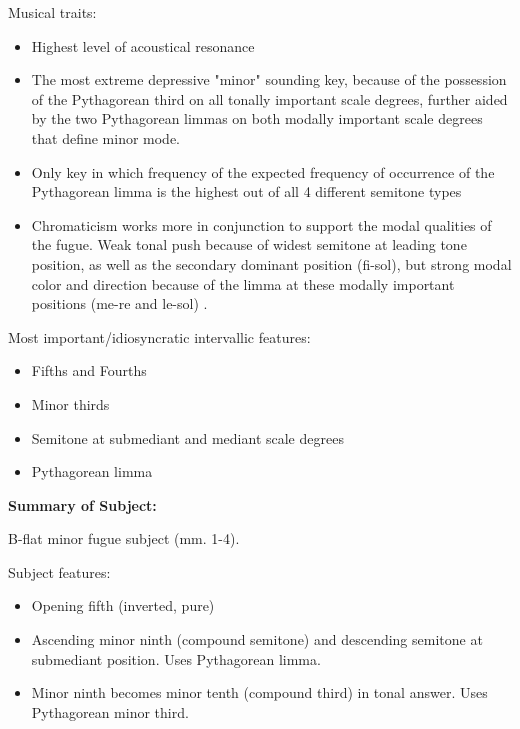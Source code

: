 Musical traits:

\begin{itemize}
\tightlist
\item
  Highest level of acoustical resonance
\item
  The most extreme depressive "minor" sounding key, because of the
  possession of the Pythagorean third on all tonally important scale
  degrees, further aided by the two Pythagorean limmas on both modally
  important scale degrees that define minor mode.
\item
  Only key in which frequency of the expected frequency of occurrence of
  the Pythagorean limma is the highest out of all 4 different semitone
  types
\item
  Chromaticism works more in conjunction to support the modal qualities
  of the fugue. Weak tonal push because of widest semitone at leading
  tone position, as well as the secondary dominant position (fi-sol),
  but strong modal color and direction because of the limma at these
  modally important positions (me-re and le-sol) .
\end{itemize}

Most important/idiosyncratic intervallic features:

\begin{itemize}
\tightlist
\item
  Fifths and Fourths
\item
  Minor thirds
\item
  Semitone at submediant and mediant scale degrees
\item
  Pythagorean limma
\end{itemize}

\textbf{Summary of Subject:}



\begin{Example}[H]
    \begin{center}
    \caption{ B-flat minor fugue subject (mm. 1-4). }
    \end{center}
\end{Example}
    

    \begin{center}
    \end{center}
    
    Subject features:

\begin{itemize}
\tightlist
\item
  Opening fifth (inverted, pure)
\item
  Ascending minor ninth (compound semitone) and descending semitone at
  submediant position. Uses Pythagorean limma.
\item
  Minor ninth becomes minor tenth (compound third) in tonal answer. Uses
  Pythagorean minor third.
\end{itemize}

